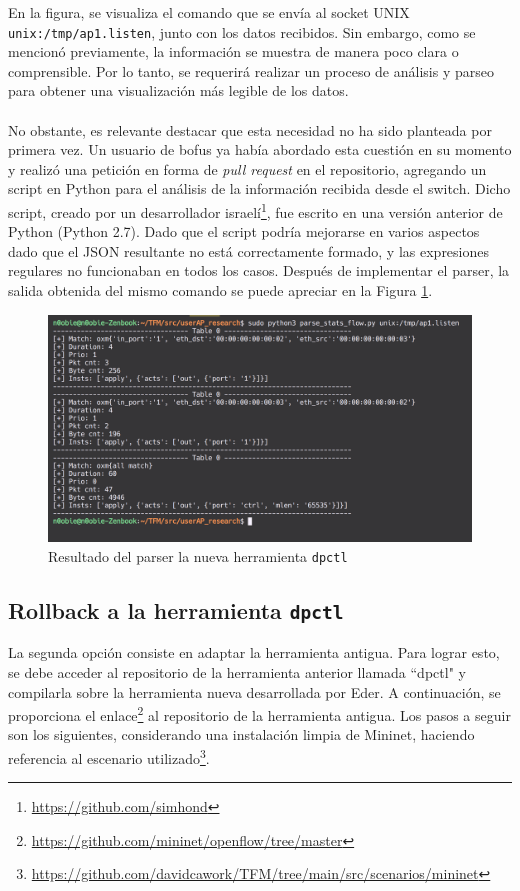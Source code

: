 En la figura, se visualiza el comando que se envía al socket UNIX \texttt{unix:/tmp/ap1.listen}, junto con los datos recibidos. Sin embargo, como se mencionó previamente, la información se muestra de manera poco clara o comprensible. Por lo tanto, se requerirá realizar un proceso de análisis y parseo para obtener una visualización más legible de los datos.\\
\\

No obstante, es relevante destacar que esta necesidad no ha sido planteada por primera vez. Un usuario de \gls{bofus} ya había abordado esta cuestión en su momento y realizó una petición en forma de \textit{pull request} en el repositorio, agregando un script en Python para el análisis de la información recibida desde el switch. Dicho script, creado por un desarrollador israelí\footnote{\url{https://github.com/simhond}}, fue escrito en una versión anterior de Python (Python 2.7). Dado que el script podría mejorarse en varios aspectos dado que el JSON resultante no está correctamente formado, y las expresiones regulares no funcionaban en todos los casos. Después de implementar el parser, la salida obtenida del mismo comando se puede apreciar en la Figura \ref{fig:dpctl_4}.


\begin{figure}[ht]
    \centering
    \includegraphics[width=\textwidth]{archivos/img/dev/dpctl_4.png}
    \caption{Resultado del parser la nueva herramienta \texttt{dpctl}}
    \label{fig:dpctl_4}
\end{figure}

\subsection{Rollback a la herramienta \texttt{dpctl}}

La segunda opción consiste en adaptar la herramienta antigua. Para lograr esto, se debe acceder al repositorio de la herramienta anterior llamada ``dpctl" y compilarla sobre la herramienta nueva desarrollada por Eder. A continuación, se proporciona el enlace\footnote{\url{https://github.com/mininet/openflow/tree/master}} al repositorio de la herramienta antigua. Los pasos a seguir son los siguientes, considerando una instalación limpia de Mininet, haciendo referencia al escenario utilizado\footnote{\url{https://github.com/davidcawork/TFM/tree/main/src/scenarios/mininet}}.

